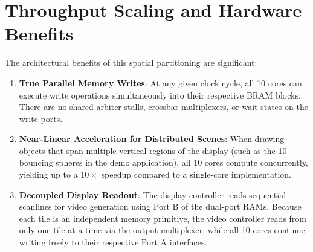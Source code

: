 \section{Throughput Scaling and Hardware Benefits}
The architectural benefits of this spatial partitioning are significant:
\begin{enumerate}
    \item \textbf{True Parallel Memory Writes}: At any given clock cycle, all 10 cores can execute write operations simultaneously into their respective BRAM blocks. There are no shared arbiter stalls, crossbar multiplexers, or wait states on the write ports.
    \item \textbf{Near-Linear Acceleration for Distributed Scenes}: When drawing objects that span multiple vertical regions of the display (such as the 10 bouncing spheres in the demo application), all 10 cores compute concurrently, yielding up to a $10\times$ speedup compared to a single-core implementation.
    \item \textbf{Decoupled Display Readout}: The display controller reads sequential scanlines for video generation using Port B of the dual-port RAMs. Because each tile is an independent memory primitive, the video controller reads from only one tile at a time via the output multiplexer, while all 10 cores continue writing freely to their respective Port A interfaces.
\end{enumerate}
